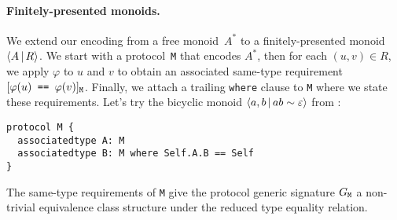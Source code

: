 \documentclass[../generics]{subfiles}
\begin{document}
\paragraph{Finitely-presented monoids.}
We extend our encoding from a free monoid~$A^*$ to a finitely-presented monoid~$\langle A\,|\,R\rangle$. We start with a protocol~\texttt{M} that encodes $A^*$, then for each $(u,v)\in R$, we apply $\varphi$ to $u$ and $v$ to obtain an associated same-type requirement $[\texttt{$\varphi(u)$ == $\varphi(v)$}]_{\texttt{M}}$. Finally, we attach a trailing \texttt{where} clause to \texttt{M} where we state these requirements. Let's try the bicyclic monoid $\langle a, b\,|\,ab\sim\varepsilon\rangle$ from :
\begin{Verbatim}
protocol M {
  associatedtype A: M
  associatedtype B: M where Self.A.B == Self
}
\end{Verbatim}

\newcommand{\SameReqPhi}[2]{\SameReq{$\varphi(#1)$}{$\varphi(#2)$}}
\newcommand{\ConfReqPhi}[1]{\ConfReq{$\varphi(#1)$}{M}}

The same-type requirements of \texttt{M} give the protocol generic signature $G_\texttt{M}$ a non-trivial equivalence class structure under the reduced type equality relation. 
\end{document}

